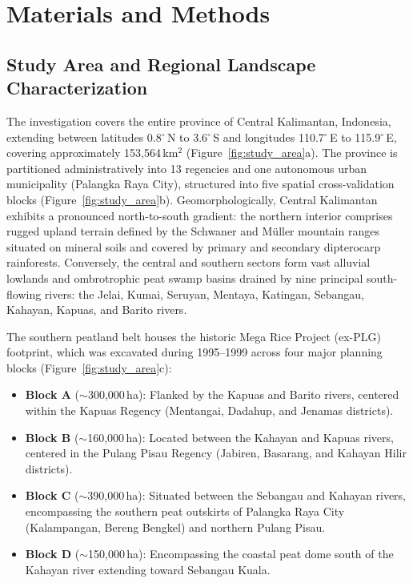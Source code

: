 \section{Materials and Methods}
\label{sec:materials_methods}

\subsection{Study Area and Regional Landscape Characterization}
\label{subsec:study_area}

The investigation covers the entire province of Central Kalimantan, Indonesia, extending between latitudes 0.8$^\circ$\,N to 3.6$^\circ$\,S and longitudes 110.7$^\circ$\,E to 115.9$^\circ$\,E, covering approximately 153,564\,km$^2$ (Figure~\ref{fig:study_area}a). The province is partitioned administratively into 13 regencies and one autonomous urban municipality (Palangka Raya City), structured into five spatial cross-validation blocks (Figure~\ref{fig:study_area}b). Geomorphologically, Central Kalimantan exhibits a pronounced north-to-south gradient: the northern interior comprises rugged upland terrain defined by the Schwaner and M{\"u}ller mountain ranges situated on mineral soils and covered by primary and secondary dipterocarp rainforests. Conversely, the central and southern sectors form vast alluvial lowlands and ombrotrophic peat swamp basins drained by nine principal south-flowing rivers: the Jelai, Kumai, Seruyan, Mentaya, Katingan, Sebangau, Kahayan, Kapuas, and Barito rivers.

The southern peatland belt houses the historic Mega Rice Project (ex-PLG) footprint, which was excavated during 1995--1999 across four major planning blocks (Figure~\ref{fig:study_area}c):
\begin{itemize}
    \item \textbf{Block A} ($\sim$300,000\,ha): Flanked by the Kapuas and Barito rivers, centered within the Kapuas Regency (Mentangai, Dadahup, and Jenamas districts).
    \item \textbf{Block B} ($\sim$160,000\,ha): Located between the Kahayan and Kapuas rivers, centered in the Pulang Pisau Regency (Jabiren, Basarang, and Kahayan Hilir districts).
    \item \textbf{Block C} ($\sim$390,000\,ha): Situated between the Sebangau and Kahayan rivers, encompassing the southern peat outskirts of Palangka Raya City (Kalampangan, Bereng Bengkel) and northern Pulang Pisau.
    \item \textbf{Block D} ($\sim$150,000\,ha): Encompassing the coastal peat dome south of the Kahayan river extending toward Sebangau Kuala.
\end{itemize}


